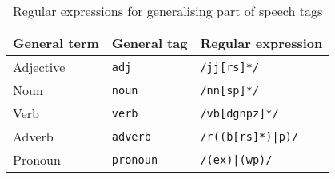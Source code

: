 \begin{center}
\begin{longtable}{ | l | l | l |}
	\caption{Regular expressions for generalising part of speech tags} \label{table:regex_pos} \\
	\hline
	General term & General tag & Regular expression \\
	\hline
	Adjective & \texttt{adj} & \texttt{/jj[rs]*/} \\
 	Noun & \texttt{noun} & \texttt{/nn[sp]*/} \\
	Verb & \texttt{verb} & \texttt{/vb[dgnpz]*/} \\
	Adverb & \texttt{adverb} & \texttt{/r((b[rs]*)|p)/} \\
	Pronoun & \texttt{pronoun} & \texttt{/(ex)|(wp)/} \\
	\hline
\end{longtable}
\end{center}




